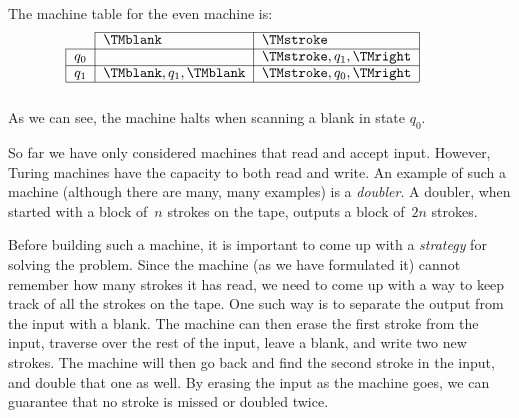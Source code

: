 \documentclass[../../../include/open-logic-section]{subfiles}
\begin{document}
\begin{ex}
The machine table for the even machine is:
\[
\centering
\begin{tabular}{lllll}
\cline{2-3}
\multicolumn{1}{l|}{}      & \multicolumn{1}{l|}{$\TMblank$}                
& \multicolumn{1}{l|}{$\TMstroke$}                &  &  \\ \cline{1-3}
\multicolumn{1}{|l|}{$q_0$} & \multicolumn{1}{l|}{}                          
& \multicolumn{1}{l|}{$\TMstroke, q_1, \TMright$} &  &  \\ \cline{1-3}
\multicolumn{1}{|l|}{$q_1$} & \multicolumn{1}{l|}{$\TMblank, q_1, \TMblank$} 
& \multicolumn{1}{l|}{$\TMstroke, q_0, \TMright$} &  &  \\ \cline{1-3}
                           &                                                &                                                 &  & 
\end{tabular}
\]
As we can see, the machine halts when scanning a blank in state $q_0$.
\end{ex}

\begin{explain}
So far we have only considered machines that read and accept input. However, 
Turing machines have the capacity to both read and write. An example of
such a machine (although there are many, many examples) is a \emph{doubler}.
A doubler, when started with a block of~$n$ strokes on the tape, outputs
a block of~$2n$ strokes.

Before building such a machine, it is important to come up with a 
\emph{strategy} for solving the problem. Since the machine (as we have 
formulated it) cannot remember how many strokes it has read, we need to
come up with a way to keep track of all the strokes
on the tape. One such way is to separate the output from the input with a
blank. The machine can then erase the first stroke from the input,
traverse over the rest of the input, leave a blank, and write two new strokes.
The machine will then go back and find the second stroke in the input, and
double that one as well. By erasing the input as the machine goes, we can guarantee
that no stroke is missed or doubled twice.
\end{explain}
\end{document}
